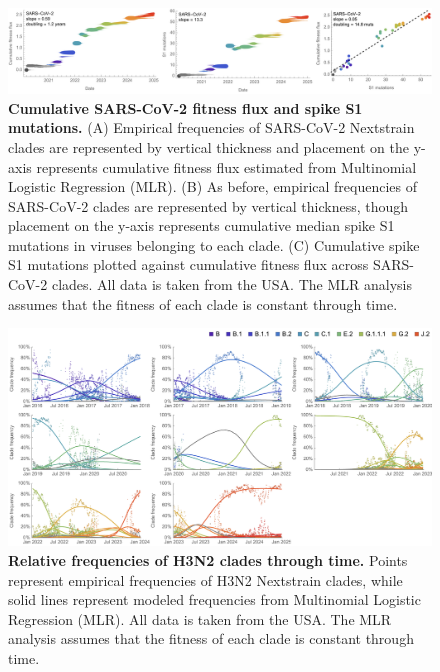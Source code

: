 \documentclass[11pt,oneside,letterpaper]{article}
\begin{document}
\begin{figure}[h]
	\centering
	\includegraphics[width=1.0\textwidth]{figures/sarscov2_clades_fitnesses_mutations}
	\caption{\textbf{Cumulative SARS-CoV-2 fitness flux and spike S1 mutations.}
  (A) Empirical frequencies of SARS-CoV-2 Nextstrain clades are represented by vertical thickness and placement on the y-axis represents cumulative fitness flux estimated from Multinomial Logistic Regression (MLR).
  (B) As before, empirical frequencies of SARS-CoV-2 clades are represented by vertical thickness, though placement on the y-axis represents cumulative median spike S1 mutations in viruses belonging to each clade.
  (C) Cumulative spike S1 mutations plotted against cumulative fitness flux across SARS-CoV-2 clades.
	All data is taken from the USA.
  The MLR analysis assumes that the fitness of each clade is constant through time.
	}
	\label{sarscov2_clades_fitnesses_mutations}
\end{figure}

\begin{figure}[h]
	\centering
	\includegraphics[width=1.0\textwidth]{figures/h3n2_clades_frequencies}
	\caption{\textbf{Relative frequencies of H3N2 clades through time.}
  Points represent empirical frequencies of H3N2 Nextstrain clades, while solid lines represent modeled frequencies from Multinomial Logistic Regression (MLR).
	All data is taken from the USA.
  The MLR analysis assumes that the fitness of each clade is constant through time.
	}
	\label{h3n2_clades_frequencies}
\end{figure}
\end{document}
